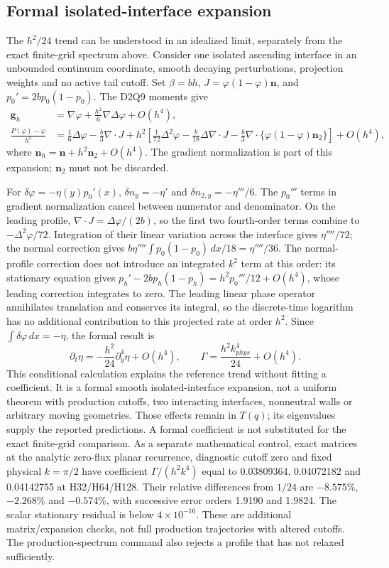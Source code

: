 \subsection{Formal isolated-interface expansion}
The $h^2/24$ trend can be understood in an idealized limit, separately
from the exact finite-grid spectrum above. Consider one isolated ascending
interface in an unbounded continuum coordinate, smooth decaying
perturbations, projection weights and no active tail cutoff. Set
$\beta=bh$, $J=\varphi(1-\varphi)\bm n$, and
$p_0'=2bp_0(1-p_0)$. The D2Q9 moments give
\begin{align}
 \bm g_h&=\nabla\varphi+\frac{h^2}{6}\nabla\Delta\varphi+O(h^4),\\
 \frac{P(\varphi)-\varphi}{h^2}
 &=\frac16\Delta\varphi-\frac b3\nabla\cdot J
 +h^2\left[\frac1{72}\Delta^2\varphi
 -\frac b{18}\Delta\nabla\cdot J
 -\frac b3\nabla\cdot\{\varphi(1-\varphi)\bm n_2\}\right]+O(h^4),
\end{align}
where $\bm n_h=\bm n+h^2\bm n_2+O(h^4)$. The gradient normalization
is part of this expansion; $\bm n_2$ must not be discarded.

For $\delta\varphi=-\eta(y)p_0'(x)$,
$\delta n_y=-\eta'$ and $\delta n_{2,y}=-\eta'''/6$.
The $p_0'''$ terms in gradient normalization cancel between numerator
and denominator. On the leading profile,
$\nabla\cdot J=\Delta\varphi/(2b)$, so the first two fourth-order
terms combine to $-\Delta^2\varphi/72$.
Integration of their linear variation across the interface gives
$\eta''''/72$; the normal correction gives
$b\eta''''\int p_0(1-p_0)\,dx/18=\eta''''/36$.
The normal-profile correction does not introduce an integrated $k^2$
term at this order: its stationary equation gives
$p_h'-2bp_h(1-p_h)=h^2p_0'''/12+O(h^4)$, whose leading correction
integrates to zero. The leading linear phase operator annihilates
translation and conserves its integral, so the discrete-time logarithm
has no additional contribution to this projected rate at order $h^2$.
Since $\int\delta\varphi\,dx=-\eta$, the formal result is
\begin{equation}
 \partial_t\eta=-\frac{h^2}{24}\partial_y^4\eta+O(h^4),\qquad
 \Gamma=\frac{h^2 k_{phys}^4}{24}+O(h^4).
\end{equation}
This conditional calculation explains the reference trend without fitting
a coefficient. It is a formal smooth isolated-interface expansion, not
a uniform theorem with production cutoffs, two interacting interfaces,
nonneutral walls or arbitrary moving geometries. Those effects remain
in $T(q)$; its eigenvalues supply the reported predictions. A formal
coefficient is not substituted for the exact finite-grid comparison.
As a separate mathematical control, exact matrices at the analytic
zero-flux planar recurrence, diagnostic cutoff zero and fixed physical
$k=\pi/2$ have coefficient $\Gamma/(h^2k^4)$ equal to
0.03809364, 0.04072182 and 0.04142755 at H32/H64/H128.
Their relative differences from $1/24$ are $-8.575$\%, $-2.268$\%
and $-0.574$\%, with successive error orders 1.9190 and 1.9824.
The scalar stationary residual is below $4\times10^{-16}$.
These are additional matrix/expansion checks, not full production
trajectories with altered cutoffs. The production-spectrum command
also rejects a profile that has not relaxed sufficiently.

